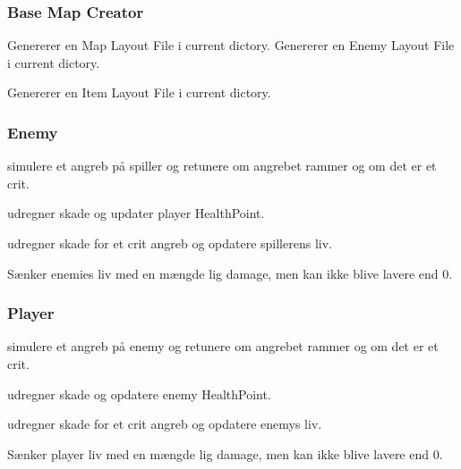 \subsubsection{Base Map Creator}

{%
  Genererer en Map Layout File i current dictory.
}
{%
  Genererer en Enemy Layout File i current dictory.
}

{%
  Genererer en Item Layout File i current dictory.
}

\subsubsection{Enemy}

{%
  simulere et angreb på spiller og retunere om angrebet rammer og om det er et crit.
}

{%
  udregner skade og updater player HealthPoint.
}

{%
  udregner skade for et crit angreb og opdatere spillerens liv.
}

{%
  Sænker enemies liv med en mængde lig damage, men kan ikke blive lavere end 0.
}

\subsubsection{Player}

{%
  simulere et angreb på enemy og retunere om angrebet rammer og om det er et crit.
}

{%
  udregner skade og opdatere enemy HealthPoint.
}

{%
  udregner skade for et crit angreb og opdatere enemys liv.
}

{%
  Sænker player liv med en mængde lig damage, men kan ikke blive lavere end 0.
}


